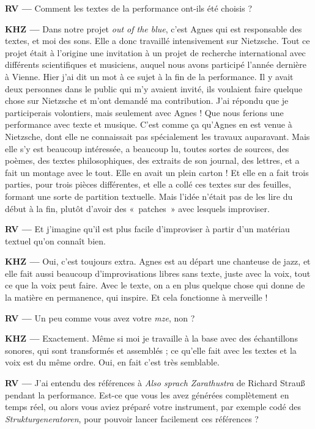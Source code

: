 \documentclass[a4paper,12pt]{article}
\newcommand{\guill}[1]{«~#1~»}
\newcommand{\maze}[0]{\emph{m\symbol{64}ze\textdegree2}}
\begin{document}
\textbf{RV ---} Comment les textes de la performance ont-ils été choisis ?

\textbf{KHZ ---} Dans notre projet \emph{out of the blue}, c'est Agnes qui est responsable des textes, et moi des sons. Elle a donc travaillé intensivement sur Nietzsche. Tout ce projet était à l’origine une invitation à un projet de recherche international avec différents scientifiques et musiciens, auquel nous avons participé l'année dernière à Vienne. Hier j'ai dit un mot à ce sujet à la fin de la performance. Il y avait deux personnes dans le public qui m'y avaient invité, ils voulaient faire quelque chose sur Nietzsche et m'ont demandé ma contribution. J'ai répondu que je participerais volontiers, mais seulement avec Agnes ! Que nous ferions une performance avec texte et musique. C'est comme ça qu'Agnes en est venue à Nietzsche, dont elle ne connaissait pas spécialement les travaux auparavant. Mais elle s'y est beaucoup intéressée, a beaucoup lu, toutes sortes de sources, des poèmes, des textes philosophiques, des extraits de son journal, des lettres, et a fait un montage avec le tout. Elle en avait un plein carton ! Et elle en a fait trois parties, pour trois pièces différentes, et elle a collé ces textes sur des feuilles, formant une sorte de partition textuelle. Mais l'idée n'était pas de les lire du début à la fin, plutôt d'avoir des \guill{patches} avec lesquels improviser.

\textbf{RV ---} Et j'imagine qu'il est plus facile d'improviser à partir d'un matériau textuel qu'on connaît bien.

\textbf{KHZ ---} Oui, c'est toujours extra. Agnes est au départ une chanteuse de jazz, et elle fait aussi beaucoup d'improvisations libres sans texte, juste avec la voix, tout ce que la voix peut faire. Avec le texte, on a en plus quelque chose qui donne de la matière en permanence, qui inspire. Et cela fonctionne à merveille !

\textbf{RV ---} Un peu comme vous avez votre \maze, non ?

\textbf{KHZ ---} Exactement. Même si moi je travaille à la base avec des échantillons sonores, qui sont transformés et assemblés ; ce qu'elle fait avec les textes et la voix est du même ordre. Oui, en fait c'est très semblable.

\textbf{RV ---} J'ai entendu des références à \emph{Also sprach Zarathustra} de Richard Strauß pendant la performance. Est-ce que vous les avez générées complètement en temps réel, ou alors vous aviez préparé votre instrument, par exemple codé des \emph{Strukturgeneratoren}, pour pouvoir lancer facilement ces références ?
\end{document}
